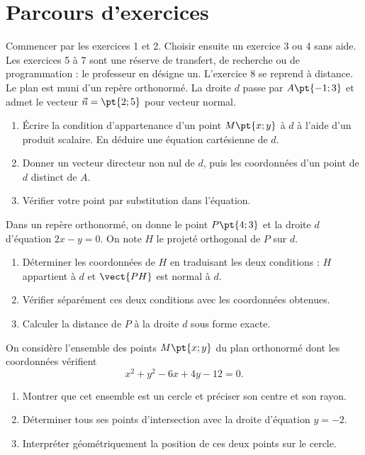 \section*{Parcours d’exercices}\label{C07-PARC}
Commencer par les exercices 1 et 2. Choisir ensuite un exercice 3 ou 4 sans aide. Les exercices 5 à 7 sont une réserve de transfert, de recherche ou de programmation : le professeur en désigne un. L’exercice 8 se reprend à distance.
\begingroup
{}
Le plan est muni d’un repère orthonormé. La droite $d$ passe par $A\pt{-1;3}$ et admet le vecteur $\vec n=\pt{2;5}$ pour vecteur normal.
\begin{enumerate}[label=\arabic*.]
\item Écrire la condition d’appartenance d’un point $M\pt{x;y}$ à $d$ à l’aide d’un produit scalaire. En déduire une équation cartésienne de $d$.
\item Donner un vecteur directeur non nul de $d$, puis les coordonnées d’un point de $d$ distinct de $A$.
\item Vérifier votre point par substitution dans l’équation.
\end{enumerate}
Dans un repère orthonormé, on donne le point $P\pt{4;3}$ et la droite $d$ d’équation $2x-y=0$. On note $H$ le projeté orthogonal de $P$ sur $d$.
\begin{enumerate}[label=\arabic*.]
\item Déterminer les coordonnées de $H$ en traduisant les deux conditions : $H$ appartient à $d$ et $\vect{PH}$ est normal à $d$.
\item Vérifier séparément ces deux conditions avec les coordonnées obtenues.
\item Calculer la distance de $P$ à la droite $d$ sous forme exacte.
\end{enumerate}
On considère l’ensemble des points $M\pt{x;y}$ du plan orthonormé dont les coordonnées vérifient\[x^2+y^2-6x+4y-12=0.\]
\begin{enumerate}[label=\arabic*.]
\item Montrer que cet ensemble est un cercle et préciser son centre et son rayon.
\item Déterminer tous ses points d’intersection avec la droite d’équation $y=-2$.
\item Interpréter géométriquement la position de ces deux points sur le cercle.
\end{enumerate}
